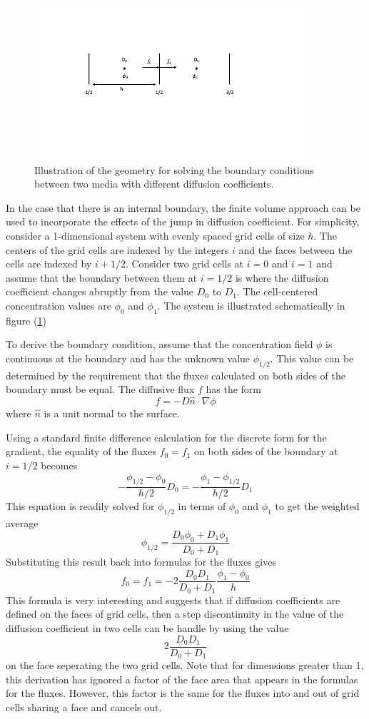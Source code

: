 \documentclass[12pt]{article}
\begin{document}
\begin{figure}
\centering
\includegraphics[width=4.0in,keepaspectratio=true]{DiffBC}
\caption{\label{diffbc} Illustration of the geometry for solving the boundary
conditions between two media with different diffusion coefficients.}
\end{figure}
In the case that there is an internal boundary, the finite volume approach can
be used to incorporate the effects of the jump in diffusion coefficient. For
simplicity, consider a 1-dimensional system with evenly spaced grid cells of
size $h$. The centers of the grid cells are indexed by the integers $i$ and the
faces between the cells are indexed by $i+1/2$. Consider two grid cells at $i=0$
and $i=1$ and assume that the boundary between them at $i=1/2$ is where the
diffusion coefficient changes abruptly from the value $D_0$ to $D_1$. The
cell-centered concentration values are $\phi_0$ and $\phi_1$. The system is
illustrated schematically in figure (\ref{diffbc})

To derive the boundary condition, assume that the concentration field $\phi$ is
continuous at the boundary and has the unknown value $\phi_{1/2}$. This value
can be determined by the requirement that the fluxes calculated on both sides of
the boundary must be equal. The diffusive flux $f$ has the form
\[
f =-D\hat{n}\cdot\nabla\phi
\]
where $\hat{n}$ is a unit normal to the surface.

Using a standard finite difference calculation for the discrete form for the
gradient, the equality of the fluxes $f_0=f_1$ on both sides of the boundary at $i=1/2$
becomes
\[
-\frac{\phi_{1/2}-\phi_0}{h/2}D_0 = -\frac{\phi_{1}-\phi_{1/2}}{h/2}D_1
\]
This equation is readily solved for $\phi_{1/2}$ in terms of $\phi_0$ and
$\phi_1$ to get the weighted average
\[
\phi_{1/2} = \frac{D_0\phi_0+D_1\phi_1}{D_0+D_1}
\]
Substituting this result back into formulas for the fluxes gives
\[
f_0=f_1=-2\frac{D_0 D_1}{D_0+D_1}\frac{\phi_1-\phi_0}{h}
\]
This formula is very interesting and suggests that if diffusion coefficients are
defined on the faces of grid cells, then a step discontinuity in the value of
the diffusion coefficient in two cells can be handle by using the value
\[
2\frac{D_0 D_1}{D_0+D_1}
\]
on the face seperating the two grid cells. Note that for dimensions greater than 1, this
derivation has ignored a factor of the face area that appears in the formulas for the
fluxes. However, this factor is the same for the fluxes into and out of grid cells
sharing a face and cancels out.
\end{document}
